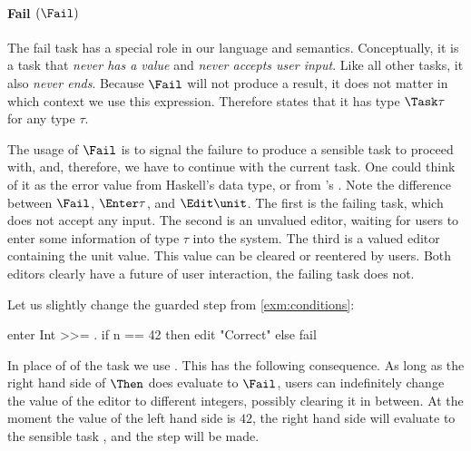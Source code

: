 \paragraph{Fail $(\Fail)$}

The fail task has a special role in our language and semantics.
Conceptually, it is a task that \emph{never has a value} and \emph{never accepts user input}.
Like all other tasks, it also \emph{never ends}.
Because $\Fail$ will not produce a result,
it does not matter in which context we use this expression.
Therefore  states that it has type $\Task \tau$ for any type $\tau$.

The usage of $\Fail$ is to signal the failure to produce a sensible task to proceed with,
and, therefore, we have to continue with the current task.
One could think of it as the error value  from Haskell's  data type,
or  from \ML's .
Note the difference between $\Fail$, $\Enter \tau$, and $\Edit \unit$.
The first is the failing task, which does not accept any input.
The second is an unvalued editor,
waiting for users to enter some information of type $\tau$ into the system.
The third is a valued editor containing the unit value.
This value can be cleared or reentered by users.
Both editors clearly have a future of user interaction,
the failing task does not.



\begin{example}

Let us slightly change the guarded step from \autoref{exm:conditions}:
\begin{TASK}
  enter Int >>= \n. if n == 42 then edit "Correct" else fail
\end{TASK}
In place of of the task  we use .
This has the following consequence.
As long as the right hand side of $\Then$ does evaluate to $\Fail$,
users can indefinitely change the value of the editor to different integers,
possibly clearing it in between.
At the moment the value of the left hand side is $42$,
the right hand side will evaluate to the sensible task ,
and the step will be made.

\end{example}



